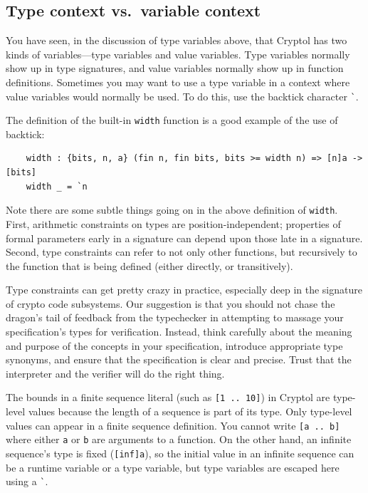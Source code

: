 \subsection{Type context vs.\ variable context}\indTypeContext
\label{sec:type-context-vs}

You have seen, in the discussion of type variables above, that Cryptol
has two kinds of variables---type variables and value variables. Type
variables normally show up in type signatures, and value variables
normally show up in function definitions. Sometimes you may want to
use a type variable in a context where value variables would normally
be used.  To do this, use the backtick character {\tt \Verb|`|}.

The definition of the built-in {\tt width} function is a good example
of the use of backtick:
\begin{Verbatim}
    width : {bits, n, a} (fin n, fin bits, bits >= width n) => [n]a -> [bits]
    width _ = `n
\end{Verbatim}

\begin{tip}
  Note there are some subtle things going on in the above definition
  of \texttt{width}.  First, arithmetic constraints on types are
  position-independent; properties of formal parameters early in a
  signature can depend upon those late in a signature.  Second, type
  constraints can refer to not only other functions, but recursively
  to the function that is being defined (either directly, or
  transitively).

  Type constraints can get pretty crazy in practice, especially deep
  in the signature of crypto code subsystems.  Our suggestion is that
  you should not chase the dragon's tail of feedback from the
  typechecker in attempting to massage your specification's types for
  verification.  Instead, think carefully about the meaning and
  purpose of the concepts in your specification, introduce appropriate
  type synonyms, and ensure that the specification is clear and
  precise.  Trust that the interpreter and the verifier will do the
  right thing.
\end{tip}

The bounds in a finite sequence literal (such as \texttt{[1 ..\ 10]}) in
Cryptol are type-level values because the length of a sequence is part
of its type.  Only type-level values can appear in a finite sequence
definition.  You cannot write \texttt{[a ..\ b]} where either \texttt{a} or
\texttt{b} are arguments to a function.  On the other hand, an infinite
sequence's type is fixed (\texttt{[inf]a}), so the initial value in an
infinite sequence can be a runtime variable or a type variable, but
type variables are escaped here using a {\tt \Verb|`|}.

